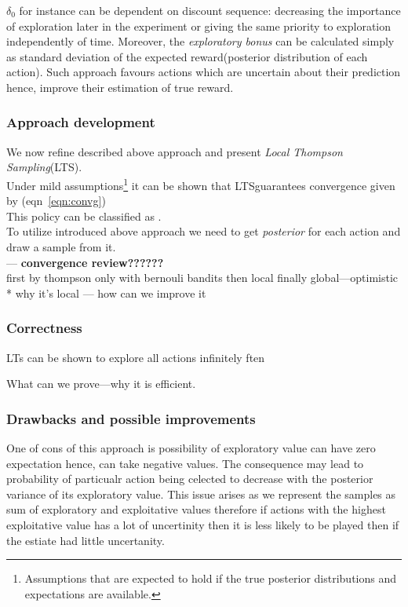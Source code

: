 \documentclass[12pt, a4paper, pdflatex, leqno]{report}
\begin{document}
$\delta_0$ for instance can be dependent on discount sequence: decreasing the importance of exploration later in the experiment or giving the same priority to exploration independently of time. Moreover, the \emph{exploratory bonus} can be calculated simply as standard deviation of the expected reward(posterior distribution of each action). Such approach favours actions which are uncertain about their prediction hence, improve their estimation of true reward.\\

\subsubsection{Approach development}
We now refine described above approach and present \emph{Local Thompson Sampling}(LTS).\\


Under mild assumptions\footnote{Assumptions that are expected to hold if the true posterior distributions and expectations are available.} it can be shown that LTSguarantees convergence given by (eqn~\ref{eqn:convg})\\


This policy can be classified as .\\

To utilize introduced above approach we need to get \emph{posterior} for each action and draw a sample from it.\\

 --- \textbf{convergence review??????}\\

first by thompson only with bernouli bandits then local finally global---optimistic\\
* why it's local --- how can we improve it\\

\subsubsection{Correctness}
LTs can be shown to explore all actions infinitely ften


What can we prove---why it is efficient.\\

\subsubsection{Drawbacks and possible improvements}
One of cons of this approach is possibility of exploratory value can have zero expectation hence, can take negative values. The consequence may lead to probability of particualr action being celected to decrease with the posterior variance of its exploratory value. This issue arises as we represent the samples as sum of exploratory and exploitative values therefore if actions with the highest exploitative value has a lot of uncertinity then it is less likely to be played then if the estiate had little uncertanity.\\
\end{document}
